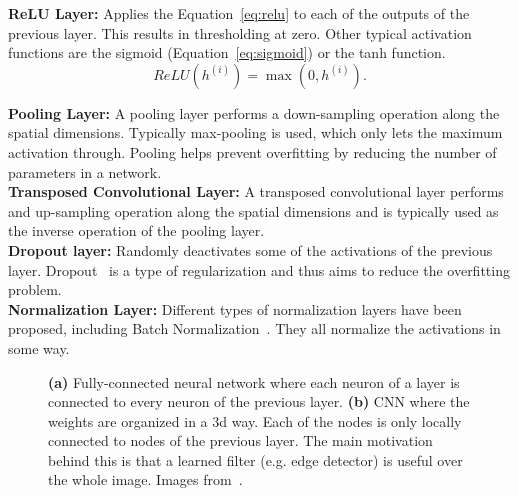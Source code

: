 \textbf{ReLU Layer:} Applies the Equation~\ref{eq:relu} to each of the outputs of the previous layer. This results in thresholding at zero. Other typical activation functions are the sigmoid (Equation~\ref{eq:sigmoid}) or the tanh function.\\
\begin{equation}
   ReLU({h}^{(i)}) = \max(0, {h}^{(i)}).
   \label{eq:relu}
\end{equation}

\textbf{Pooling Layer:} A pooling layer performs a down-sampling operation along the spatial dimensions. Typically max-pooling is used, which only lets the maximum activation through. Pooling helps prevent overfitting by reducing the number of parameters in a network.\\

\textbf{Transposed Convolutional Layer:} A transposed convolutional layer performs and up-sampling operation along the spatial dimensions and is typically used as the inverse operation of the pooling layer.\\

\textbf{Dropout layer:} Randomly deactivates some of the activations of the previous layer. Dropout~\cite{Srivastava2014Dropout:Overfitting} is a type of regularization and thus aims to reduce the overfitting problem.\\

\textbf{Normalization Layer:} Different types of normalization layers have been proposed, including Batch Normalization~\cite{SergeyIoffe2015BatchNormalization}. They all normalize the activations in some way.
 
\begin{figure}[htbp]
	\centering
	\hfill
	\caption[Regular Neural Networks and Convolutional Neural Networks]{\textbf{(a)} Fully-connected neural network where each neuron of a layer is connected to every neuron of the previous layer. \textbf{(b)} CNN where the weights are organized in a \gls{3d} way. Each of the nodes is only locally connected to nodes of the previous layer. The main motivation behind this is that a learned filter (e.g. edge detector) is useful over the whole image. Images from~\cite{KarpathyStanfordRecognition}.}
	\label{fig:mlearn_nn_cnn}  
\end{figure}


